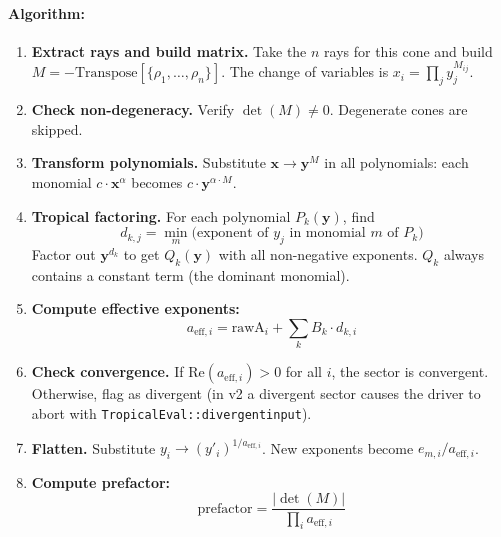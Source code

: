 \documentclass[11pt,a4paper]{article}
\begin{document}
\paragraph{Algorithm:}
\begin{enumerate}
  \item \textbf{Extract rays and build matrix.} Take the $n$ rays for this cone and build $M = -\mathrm{Transpose}[\{\rho_1, \ldots, \rho_n\}]$. The change of variables is $x_i = \prod_j y_j^{M_{ij}}$.

  \item \textbf{Check non-degeneracy.} Verify $\det(M) \neq 0$. Degenerate cones are skipped.

  \item \textbf{Transform polynomials.} Substitute $\mathbf{x} \to \mathbf{y}^M$ in all polynomials: each monomial $c \cdot \mathbf{x}^\alpha$ becomes $c \cdot \mathbf{y}^{\alpha \cdot M}$.

  \item \textbf{Tropical factoring.} For each polynomial $P_k(\mathbf{y})$, find
    \begin{equation}
    d_{k,j} = \min_m \bigl(\text{exponent of } y_j \text{ in monomial } m \text{ of } P_k\bigr)
    \end{equation}
    Factor out $\mathbf{y}^{d_k}$ to get $Q_k(\mathbf{y})$ with all non-negative exponents. $Q_k$ always contains a constant term (the dominant monomial).

  \item \textbf{Compute effective exponents:}
    \begin{equation}
    a_{\mathrm{eff},i} = \mathrm{rawA}_i + \sum_k B_k \cdot d_{k,i}
    \end{equation}

  \item \textbf{Check convergence.} If $\mathrm{Re}(a_{\mathrm{eff},i}) > 0$ for all $i$, the sector is convergent. Otherwise, flag as divergent (in v2 a divergent sector causes the driver to abort with \texttt{TropicalEval::divergentinput}).

  \item \textbf{Flatten.} Substitute $y_i \to (y'_i)^{1/a_{\mathrm{eff},i}}$. New exponents become $e_{m,i}/a_{\mathrm{eff},i}$.

  \item \textbf{Compute prefactor:}
    \begin{equation}
    \mathrm{prefactor} = \frac{|\det(M)|}{\prod_i a_{\mathrm{eff},i}}
    \end{equation}
\end{enumerate}
\end{document}

